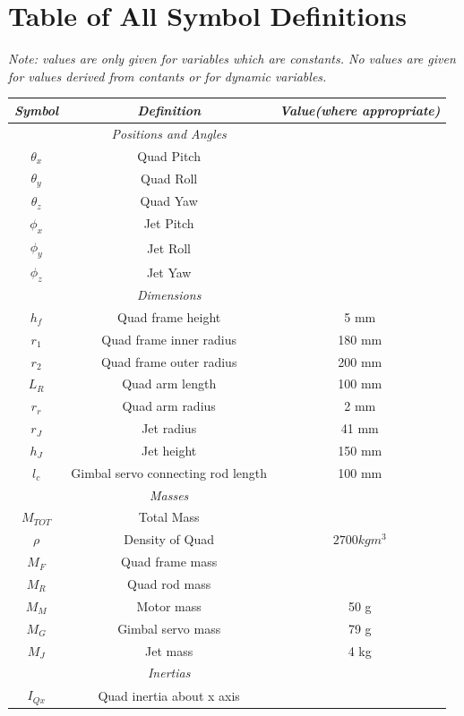 \documentclass[11pt]{article}
\begin{document}
\section{Table of All Symbol Definitions}
\begin{center}
    \emph{Note: values are only given for variables which are constants. No values are given for values derived from contants or for dynamic variables.}
\begin{longtable}{|ccc|}
    \hline
    \emph{Symbol} & \emph{Definition} & \emph{Value(where appropriate)} \\
    \hline \endhead
    & \emph{Positions and Angles} & \\
    \hline
    $\theta_x$ & Quad Pitch & \\
    $\theta_y$ & Quad Roll & \\
    $\theta_z$ & Quad Yaw & \\
    $\phi_x$ & Jet Pitch & \\
    $\phi_y$ & Jet Roll & \\
    $\phi_z$ & Jet Yaw & \\
    \hline
    & \emph{Dimensions} & \\
    \hline
    $h_f$ & Quad frame height & 5 mm \\
    $r_1$ & Quad frame inner radius & 180 mm \\
    $r_2$ & Quad frame outer radius & 200 mm \\
    $L_R$ & Quad arm length & 100 mm \\
    $r_r$ & Quad arm radius & 2 mm \\
    $r_J$ & Jet radius & 41 mm \\
    $h_J$ & Jet height & 150 mm \\
    $l_c$ & Gimbal servo connecting rod length & 100 mm \\
    \hline
    & \emph{Masses} & \\
    \hline
    $M_{TOT}$ & Total Mass & \\
    $\rho$ & Density of Quad & $2700 kgm^3$ \\
    $M_F$ & Quad frame mass & \\
    $M_R$ & Quad rod mass & \\
    $M_M$ & Motor mass & 50 g \\
    $M_G$ & Gimbal servo mass & 79 g \\
    $M_J$ & Jet mass & 4 kg\\
    \hline
    & \emph{Inertias} & \\
    \hline
    $I_{Qx}$ & Quad inertia about x axis & \\

\end{longtable}
\end{center}
\end{document}
